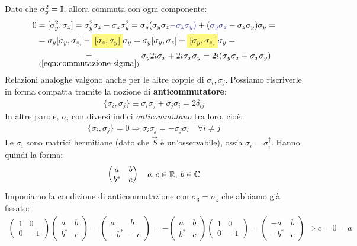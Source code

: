 \documentclass[../../FisicaTeorica.tex]{subfiles}
\begin{document}
Dato che $\sigma_y^2 = \mathbb{I}$, allora commuta con ogni componente:
\begin{align*}
0 &= [\sigma_y^2, \sigma_z]=\sigma_y^2 \sigma_z - \sigma_z \sigma_y^2 = \sigma_y(\sigma_y\sigma_z \textcolor{Blue}{- \sigma_z \sigma_y)} + (\textcolor{Blue}{\sigma_y \sigma_z} -\sigma_z \sigma_y) \sigma_y =\\
&= \sigma_y[\sigma_y, \sigma_z] - \hlc{Yellow}{[\sigma_z, \sigma_y]}\sigma_y = \sigma_y[\sigma_y, \sigma_z] + \hlc{Yellow}{[\sigma_y,\sigma_z]}\sigma_y = \\
&\underset{(\ref{eqn:commutazione-sigma})}{=}\sigma_y 2i \sigma_x + 2i \sigma_x \sigma_y = 2i(\sigma_y \sigma_x + \sigma_x \sigma_y) 
\end{align*}
Relazioni analoghe valgono anche per le altre coppie di $\sigma_i, \sigma_j$. Possiamo riscriverle in forma compatta tramite la nozione di \textbf{anticommutatore}:
\begin{align}
\{\sigma_i, \sigma_j\} \equiv \sigma_i \sigma_j + \sigma_j \sigma_i = 2\delta_{ij}
\label{eqn:relazioni-anticommutazione}
\end{align}
In altre parole, $\sigma_i$ con diversi indici \textit{anticommutano} tra loro, cioè:
\begin{align*}
\{\sigma_i, \sigma_j\} = 0 \Rightarrow \sigma_i \sigma_j = -\sigma_j\sigma_i \quad \forall i\neq j
\end{align*}
Le $\sigma_i$ sono matrici hermitiane (dato che $\vec{S}$ è un'osservabile), ossia $\sigma_i = \sigma_i^\dag$. Hanno quindi la forma:
\[
\begin{pmatrix}
a & b\\
b^* & c
\end{pmatrix}\quad a,c\in \mathbb{R},\> b\in \mathbb{C}
\]
Imponiamo la condizione di anticommutazione con $\sigma_3 = \sigma_z$ che abbiamo già fissato:
\begin{align*}
\begin{pmatrix}
1 & 0\\
0 & -1
\end{pmatrix} \begin{pmatrix}
a & b\\
b^* & c
\end{pmatrix} =
\begin{pmatrix}
a & b\\
-b^* & -c
\end{pmatrix} =-
\begin{pmatrix}
a & b\\
b^* & c
\end{pmatrix}
\begin{pmatrix}
1 & 0\\
0& -1
\end{pmatrix} =
\begin{pmatrix}
-a & b\\
-b^* & c
\end{pmatrix} \Rightarrow c=0=a
\end{align*}
\end{document}
